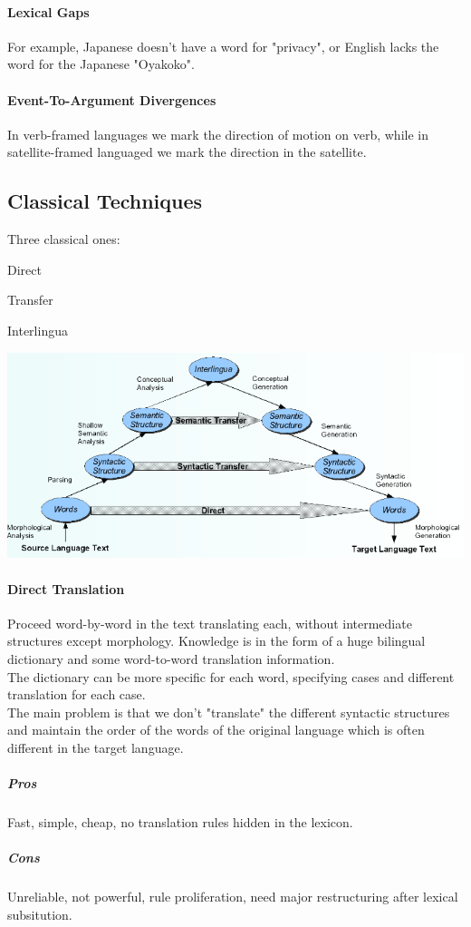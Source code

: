 \documentclass[10pt]{report}
\begin{document}
\paragraph{Lexical Gaps} For example, Japanese doesn't have a word for "privacy", or English lacks the word for the Japanese "Oyakoko".
\paragraph{Event-To-Argument Divergences} In verb-framed languages we mark the direction of motion on verb, while in satellite-framed languaged we mark the direction in the satellite.
\subsection{Classical Techniques} Three classical ones:\begin{list}{}{}
	\item Direct
	\item Transfer
	\item Interlingua
\end{list}
\begin{center}
	\includegraphics[scale=0.75]{41.png}
\end{center}
\paragraph{Direct Translation} Proceed word-by-word in the text translating each, without intermediate structures except morphology. Knowledge is in the form of a huge bilingual dictionary and some word-to-word translation information.\\
The dictionary can be more specific for each word, specifying cases and different translation for each case.\\
The main problem is that we don't "translate" the different syntactic structures and maintain the order of the words of the original language which is often different in the target language.
\subparagraph{Pros} Fast, simple, cheap, no translation rules hidden in the lexicon.
\subparagraph{Cons} Unreliable, not powerful, rule proliferation, need major restructuring after lexical subsitution.
\end{document}
